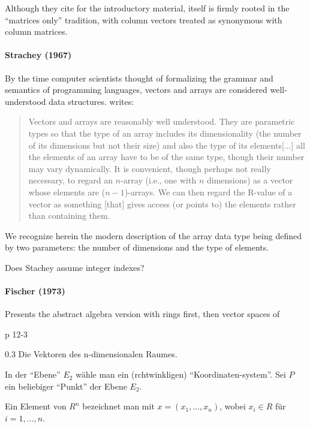 Although they cite \cite{Faddeev1959} for the introductory material, \cite{Faddeev1959} itself is firmly rooted in the ``matrices only'' tradition, with column vectors treated as synonymous with column matrices.



\paragraph{Strachey (1967)~\cite{Strachey1967}}

By the time computer scientists thought of formalizing the grammar and semantics of programming languages,
vectors and arrays are considered well-understood data structures. \cite[\S 3.7.7, pp. 43--44]{Strachey1967} writes:
\begin{quote}
Vectors and arrays are reasonably well understood. They are parametric types so that the type of an array includes its dimensionality (the number of
its dimensions but not their size) and also the type of its elements[...]
all the elements of an array have to be of the same type, though their number may vary dynamically.
It is convenient, though perhaps not really necessary, to regard an $n$-array
(i.e., one with $n$ dimensions) as a vector whose elements are ($n-1$)-arrays.
We can then regard the R-value of a vector as something [that] gives access (or points to) the elements rather than containing them.
\end{quote}
We recognize herein the modern description of the array data type being defined by
two parameters: the number of dimensions and the type of elements.

Does Stachey assume integer indexes?



\paragraph{Fischer (1973)~\cite{Fischer1973}}

Presents the abstract algebra version with rings first, then vector spaces of

p 12-3

0.3 Die Vektoren des n-dimensionalen Raumes.

In der ``Ebene'' $E_2$ wähle man ein (rchtwinkligen) ``Koordinaten-system''. Sei $P$ ein beliebiger ``Punkt'' der Ebene $E_2$.

Ein Element von $R^n$ bezeichnet man mit $x = (x_1, ..., x_n)$, wobei $x_i \in R$ für $i = 1,..., n$.

